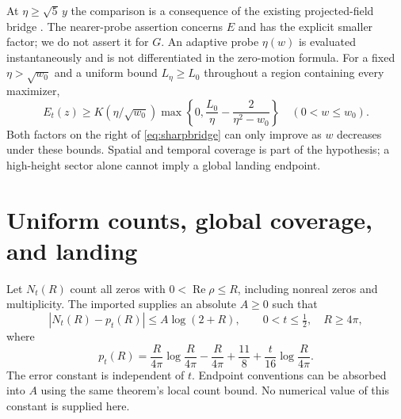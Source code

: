 \documentclass[11pt]{article}
\numberwithin{equation}{section}
\theoremstyle{definition}
\theoremstyle{remark}
\DeclareMathOperator{\Rea}{Re}
\begin{document}
At $\eta\ge\sqrt5\,y$ the comparison is a consequence of the
existing projected-field bridge \cite[Proposition~2.3]{planat}.
The nearer-probe assertion concerns $E$ and has the explicit smaller
factor; we do not assert it for $G$. An adaptive probe $\eta(w)$ is
evaluated instantaneously and is not differentiated in the zero-motion
formula. For a fixed $\eta>\sqrt{w_0}$ and a uniform bound
$L_\eta\ge L_0$ throughout a region containing every maximizer,
\begin{equation}\label{eq:fixedprobefloor}
 E_t(z)\ge K(\eta/\sqrt{w_0})
 \max\left\{0,\frac{L_0}{\eta}-\frac2{\eta^2-w_0}\right\}
 \quad(0<w\le w_0).
\end{equation}
Both factors on the right of \eqref{eq:sharpbridge} can only improve
as $w$ decreases under these bounds. Spatial and temporal coverage
is part of the hypothesis; a high-height sector alone cannot imply
a global landing endpoint.

\section{Uniform counts, global coverage, and landing}
\label{sec:landing}
Let $N_t(R)$ count all zeros with $0<\Rea\rho\le R$, including
nonreal zeros and multiplicity. The imported
\cite[Theorem~1.5(iv)]{polymath} supplies an absolute $A\ge0$ such that
\begin{equation}\label{eq:count}
 |N_t(R)-p_t(R)|\le A\log(2+R),\qquad 0<t\le\tfrac12,\quad R\ge4\pi,
\end{equation}
where
\[
 p_t(R)=\frac R{4\pi}\log\frac R{4\pi}-\frac R{4\pi}
          +\frac{11}{8}+\frac t{16}\log\frac R{4\pi}.
\]
The error constant is independent of $t$. Endpoint conventions can
be absorbed into $A$ using the same theorem's local count bound.
No numerical value of this constant is supplied here.
\end{document}
